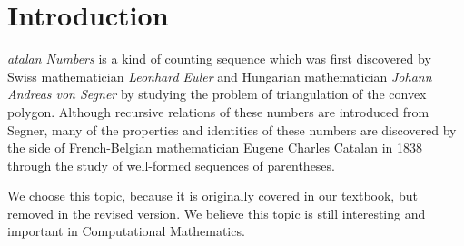 \newpage
\section{Introduction}
\lettrine[findent=2pt]{}{ }\textit{atalan Numbers} is a kind of counting sequence which was first discovered by Swiss mathematician \textit{Leonhard Euler} and Hungarian mathematician \textit{Johann Andreas von Segner}\cite{oconnor2004segner} by studying the problem of triangulation of the convex polygon\cite{mathshistory}. 
Although recursive relations of these numbers are introduced from Segner, many of the properties and identities of these numbers are discovered by the side of French-Belgian mathematician Eugene Charles Catalan in 1838 through the study of well-formed sequences of parentheses.

We choose this topic, because it is originally covered in our textbook, but removed in the revised version. We believe this topic is still interesting and important in Computational Mathematics. 